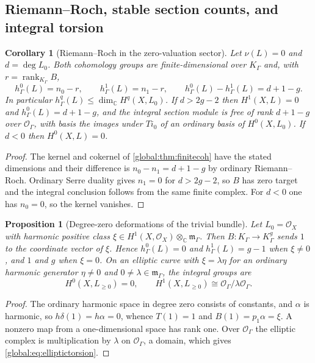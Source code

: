 \documentclass[11pt,letterpaper]{article}
\newtheorem{proposition}[proposition]{Proposition}
\newtheorem{corollary}[corollary]{Corollary}
\theoremstyle{definition}
\theoremstyle{remark}
\newcommand{\C}{\mathbb C}
\newcommand{\OO}{\mathcal O}
\newcommand{\KK}{K_\Gamma}
\newcommand{\mK}{\mathfrak m_\Gamma}
\newcommand{\rank}{\operatorname{rank}}
\numberwithin{equation}{section}
\begin{document}
\subsection{Riemann--Roch, stable section counts, and integral torsion}

\begin{corollary}[Riemann--Roch in the zero-valuation sector]\label{global:cor:RRcompact}
Let $\nu(L)=0$ and $d=\deg L_0$. Both cohomology groups are finite-dimensional over $\KK$ and, with $r=\rank_{\KK}B$,
\[
  h^0_\Gamma(L)=n_0-r,\qquad h^1_\Gamma(L)=n_1-r,
  \qquad h^0_\Gamma(L)-h^1_\Gamma(L)=d+1-g .
\]
In particular $h^q_\Gamma(L)\le\dim_\C H^q(X,L_0)$. If $d>2g-2$ then $H^1(X,L)=0$ and $h^0_\Gamma(L)=d+1-g$, and the integral section module is \emph{free} of rank $d+1-g$ over $\OO_\Gamma$, with basis the images under $Ti_0$ of an ordinary basis of $H^0(X,L_0)$. If $d<0$ then $H^0(X,L)=0$.
\end{corollary}

\begin{proof}
The kernel and cokernel of \cref{global:thm:finitecoh} have the stated dimensions and their difference is $n_0-n_1=d+1-g$ by ordinary Riemann--Roch. Ordinary Serre duality gives $n_1=0$ for $d>2g-2$, so $B$ has zero target and the integral conclusion follows from the same finite complex. For $d<0$ one has $n_0=0$, so the kernel vanishes.
\end{proof}

\begin{proposition}[Degree-zero deformations of the trivial bundle]\label{global:prop:degreezero}
Let $L_0=\OO_X$ with harmonic positive class $\xi\in H^1(X,\OO_X)\otimes_\C\mK$. Then $B:\KK\to\KK^g$ sends $1$ to the coordinate vector of $\xi$. Hence $h^0_\Gamma(L)=0$ and $h^1_\Gamma(L)=g-1$ when $\xi\ne0$, and $1$ and $g$ when $\xi=0$. On an elliptic curve with $\xi=\lambda\eta$ for an ordinary harmonic generator $\eta\ne0$ and $0\ne\lambda\in\mK$, the integral groups are
\begin{equation}\label{global:eq:elliptictorsion}
  H^0(X,L_{\ge0})=0,\qquad H^1(X,L_{\ge0})\cong\OO_\Gamma/\lambda\OO_\Gamma .
\end{equation}
\end{proposition}

\begin{proof}
The ordinary harmonic space in degree zero consists of constants, and $\alpha$ is harmonic, so $h\delta(1)=h\alpha=0$, whence $T(1)=1$ and $B(1)=p_1\alpha=\xi$. A nonzero map from a one-dimensional space has rank one. Over $\OO_\Gamma$ the elliptic complex is multiplication by $\lambda$ on $\OO_\Gamma$, a domain, which gives \eqref{global:eq:elliptictorsion}.
\end{proof}
\end{document}

